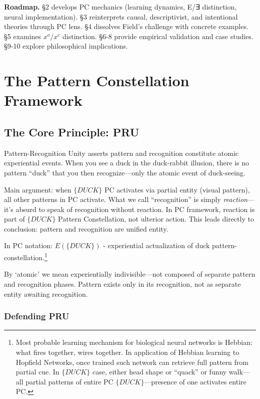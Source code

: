 \documentclass[12pt]{article}
\begin{document}
\textbf{Roadmap.} §2 develops PC mechanics (learning dynamics, E/∃ distinction, neural implementation). §3 reinterprets causal, descriptivist, and intentional theories through PC lens. §4 dissolves Field's challenge with concrete examples. §5 examines \(x^o/x^c\) distinction. §6-8 provide empirical validation and case studies. §9-10 explore philosophical implications.

\section{The Pattern Constellation Framework}\label{the-pattern-constellation-framework}

\subsection{The Core Principle: PRU}\label{the-core-principle-pru}

Pattern-Recognition Unity asserts pattern and recognition constitute atomic experiential events. When you see a duck in the duck-rabbit illusion, there is no pattern ``duck'' that you then recognize---only the atomic event of duck-seeing.

Main argument: when \(\{DUCK\}\) PC activates via partial entity (visual pattern), all other patterns in PC activate. What we call ``recognition'' is simply \emph{reaction}---it's absurd to speak of recognition without reaction. In PC framework, reaction is part of \(\{DUCK\}\) Pattern Constellation, not ulterior action. This leads directly to conclusion: pattern and recognition are unified entity.

In PC notation: \(E(\{DUCK\})\) - experiential actualization of duck pattern-constellation.\footnote{Most probable learning mechanism for biological neural networks is Hebbian: what fires together, wires together. In application of Hebbian learning to Hopfield Networks, once trained such network can retrieve full pattern from partial cue. In \(\{DUCK\}\) case, either head shape or ``quack'' or funny walk---all partial patterns of entire PC \(\{DUCK\}\)---presence of one activates entire PC.}

By `atomic' we mean experientially indivisible---not composed of separate pattern and recognition phases. Pattern exists only in its recognition, not as separate entity awaiting recognition.

\subsubsection{Defending PRU}\label{defending-pru}
\end{document}
